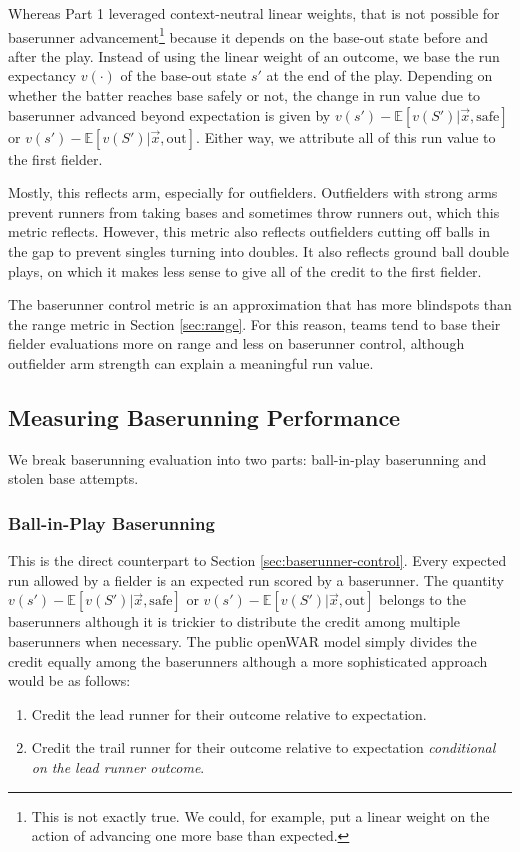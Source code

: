 \documentclass{article}
\begin{document}
      Whereas Part 1 leveraged context-neutral linear weights, that is not possible for baserunner advancement\footnote{This is not exactly true. We could, for example, put a linear weight on the action of advancing one more base than expected.} because it depends on the base-out state before and after the play. Instead of using the linear weight of an outcome, we base the run expectancy $v(\cdot)$ of the base-out state $s'$ at the end of the play. Depending on whether the batter reaches base safely or not, the change in run value due to baserunner advanced beyond expectation is given by $v(s') - \mathbb{E}[v(S') | \vec x, \mbox{safe}]$ or $v(s') - \mathbb{E}[v(S') | \vec x, \mbox{out}]$. Either way, we attribute all of this run value to the first fielder.

      Mostly, this reflects arm, especially for outfielders. Outfielders with strong arms prevent runners from taking bases and sometimes throw runners out, which this metric reflects. However, this metric also reflects outfielders cutting off balls in the gap to prevent singles turning into doubles. It also reflects ground ball double plays, on which it makes less sense to give all of the credit to the first fielder.

      The baserunner control metric is an approximation that has more blindspots than the range metric in Section \ref{sec:range}. For this reason, teams tend to base their fielder evaluations more on range and less on baserunner control, although outfielder arm strength can explain a meaningful run value.

  \subsection{\sc Measuring Baserunning Performance}

    We break baserunning evaluation into two parts: ball-in-play baserunning and stolen base attempts.

    \subsubsection{\sc Ball-in-Play Baserunning}

      This is the direct counterpart to Section \ref{sec:baserunner-control}. Every expected run allowed by a fielder is an expected run scored by a baserunner. The quantity $v(s') - \mathbb{E}[v(S') | \vec x, \mbox{safe}]$ or $v(s') - \mathbb{E}[v(S') | \vec x, \mbox{out}]$ belongs to the baserunners although it is trickier to distribute the credit among multiple baserunners when necessary. The public openWAR model simply divides the credit equally among the baserunners although a more sophisticated approach would be as follows:
      \begin{enumerate}
        \item Credit the lead runner for their outcome relative to expectation.
        \item Credit the trail runner for their outcome relative to expectation {\it conditional on the lead runner outcome}.
      \end{enumerate}
\end{document}
